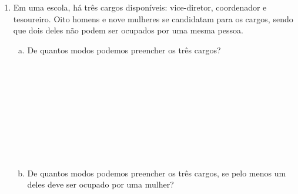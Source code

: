 \documentclass[a4paper,14pt]{article}
\begin{document}
\begin{multicols}{2}
\begin{enumerate}
			\item Em uma escola, há três cargos disponíveis: vice-diretor, coordenador e tesoureiro. Oito homens e nove mulheres se candidatam para os cargos, sendo que dois deles não podem ser ocupados por uma mesma pessoa.
			\begin{enumerate}[a)]
				\item De quantos modos podemos preencher os três cargos? \\\\\\\\\\\\\\\\\\\\
				\item De quantos modos podemos preencher os três cargos, se pelo menos um deles deve ser ocupado por uma mulher? \\\\\\\\\\\\\\\\\\\\\\\\\\\\\\\\\\\\\\\\\\\\\\\\\\\\\\\\\\\\\\\\\\\\\\\\\\
			\end{enumerate}

\end{enumerate}
\end{multicols}
\end{document}
